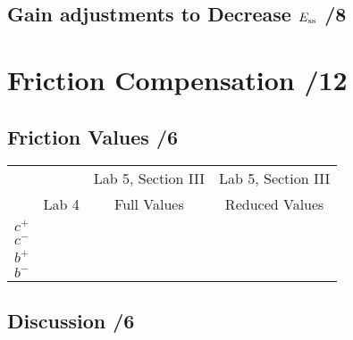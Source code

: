 \documentclass{article}
\newcommand{\score}{\hfill \underline{\hspace{1cm}}/}
\begin{document}
\subsection{Gain adjustments to Decrease $E_{\rm ss}$ \score 8}


\section{\sc Friction Compensation \score 12}
\subsection{Friction Values \score 6}
\begin{center}
\begin{tabular}{lccc}
&       & Lab 5, Section III & Lab 5, Section III \\
& Lab 4 & Full Values        & Reduced Values \\
\hline
$c^+$ & & & \\
$c^-$ & & & \\
$b^+$ & & & \\
$b^-$ & & &
\end{tabular}
\end{center}
\subsection{Discussion \score 6}
\end{document}
